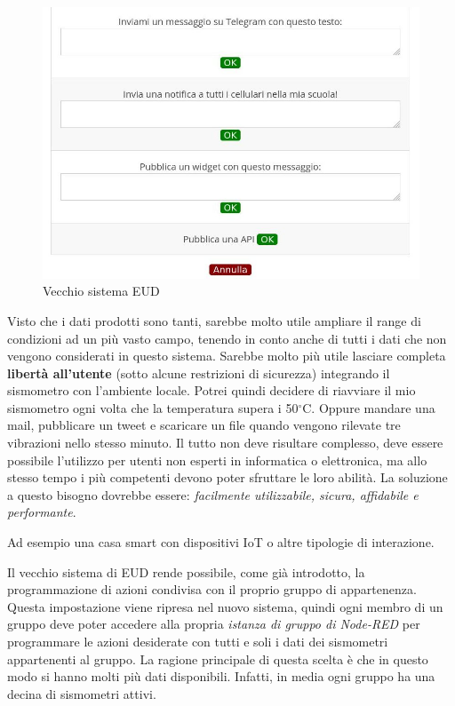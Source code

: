 \documentclass[a4paper,10pt]{memoir}
\begin{document}
\begin{figure}[H]
\caption{Vecchio sistema EUD}
\label{VecchioEUD}
\includegraphics[width=1\textwidth]{Chapter-3/eud-vecchio.jpg}
\end{figure}
Visto che i dati prodotti sono tanti, sarebbe molto utile ampliare il range di condizioni ad un più vasto campo, tenendo in conto anche di tutti i dati che non vengono considerati in questo sistema.
Sarebbe molto più utile lasciare completa \textbf{libertà all'utente} (sotto alcune restrizioni di sicurezza) integrando il sismometro con l'ambiente locale. 
Potrei quindi decidere di riavviare il mio sismometro ogni volta che la temperatura supera i 50$^{\circ}$C. Oppure mandare una mail, pubblicare un tweet e scaricare un file quando vengono rilevate tre vibrazioni nello stesso minuto.
Il tutto non deve risultare complesso, deve essere possibile l'utilizzo per utenti non esperti in informatica o elettronica, ma allo stesso tempo i più competenti devono poter sfruttare le loro abilità.
La soluzione a questo bisogno dovrebbe essere: \textit{facilmente utilizzabile, sicura, affidabile e performante}.

Ad esempio una casa smart con dispositivi IoT o altre tipologie di interazione.

Il vecchio sistema di EUD rende possibile, come già introdotto, la programmazione di azioni condivisa con il proprio gruppo di appartenenza.
Questa impostazione viene ripresa nel nuovo sistema, quindi ogni membro di un gruppo deve poter accedere alla propria \textit{istanza di gruppo di Node-RED} per programmare le azioni desiderate con tutti e soli i dati dei sismometri appartenenti al gruppo.
La ragione principale di questa scelta è che in questo modo si hanno molti più dati disponibili. Infatti, in media ogni gruppo ha una decina di sismometri attivi.
\end{document}
